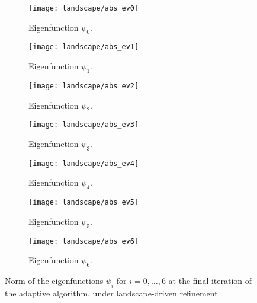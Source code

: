 \begin{figure}[htbp]
    \begin{subfigure}[t]{0.49\textwidth}
        \centering
        \texttt{[image: landscape/abs\_ev0]}
        \caption{Eigenfunction \(\psi_0\).}
        \label{fig:eigenfunction_0}
    \end{subfigure}
    \begin{subfigure}[t]{0.49\textwidth}
        \centering
        \texttt{[image: landscape/abs\_ev1]}
        \caption{Eigenfunction \(\psi_1\).}
        \label{fig:eigenfunction_1}
    \end{subfigure}
    \vspace{1cm}
    \begin{subfigure}[t]{0.49\textwidth}
        \centering
        \texttt{[image: landscape/abs\_ev2]}
        \caption{Eigenfunction \(\psi_2\).}
        \label{fig:eigenfunction_2}
    \end{subfigure}
    \begin{subfigure}[t]{0.49\textwidth}
        \centering
        \texttt{[image: landscape/abs\_ev3]}
        \caption{Eigenfunction \(\psi_3\).}
        \label{fig:eigenfunction_3}
    \end{subfigure}
    \vspace{1cm}
    \begin{subfigure}[t]{0.49\textwidth}
        \centering
        \texttt{[image: landscape/abs\_ev4]}
        \caption{Eigenfunction \(\psi_4\).}
        \label{fig:eigenfunction_4}
    \end{subfigure}
    \begin{subfigure}[t]{0.49\textwidth}
        \centering
        \texttt{[image: landscape/abs\_ev5]}
        \caption{Eigenfunction \(\psi_5\).}
        \label{fig:eigenfunction_5}
    \end{subfigure}
    \vspace{1cm}
    \begin{subfigure}[t]{0.49\textwidth}
        \centering
        \texttt{[image: landscape/abs\_ev6]}
        \caption{Eigenfunction \(\psi_6\).}
        \label{fig:eigenfunction_6}
    \end{subfigure}
    \caption{Norm of the eigenfunctions \(\psi_i\) for \(i = 0, \ldots, 6\) at the final iteration of the adaptive algorithm, under landscape-driven refinement.}
\end{figure}


